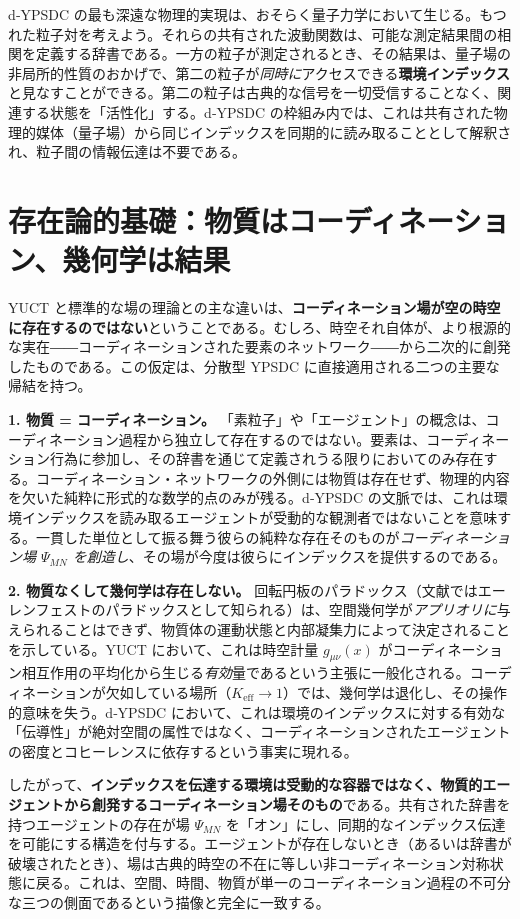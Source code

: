 \documentclass[11pt,a4paper]{article}
\begin{document}
	d‑YPSDC の最も深遠な物理的実現は、おそらく量子力学において生じる。もつれた粒子対を考えよう。それらの共有された波動関数は、可能な測定結果間の相関を定義する辞書である。一方の粒子が測定されるとき、その結果は、量子場の非局所的性質のおかげで、第二の粒子が\emph{同時に}アクセスできる\textbf{環境インデックス}と見なすことができる。第二の粒子は古典的な信号を一切受信することなく、関連する状態を「活性化」する。d‑YPSDC の枠組み内では、これは共有された物理的媒体（量子場）から同じインデックスを同期的に読み取ることとして解釈され、粒子間の情報伝達は不要である。
	
	\section{存在論的基礎：物質はコーディネーション、幾何学は結果}
	
	YUCT と標準的な場の理論との主な違いは、\textbf{コーディネーション場が空の時空に存在するのではない}ということである。むしろ、時空それ自体が、より根源的な実在――コーディネーションされた要素のネットワーク――から二次的に創発したものである。この仮定は、分散型 YPSDC に直接適用される二つの主要な帰結を持つ。
	
	\textbf{1. 物質 = コーディネーション。} 「素粒子」や「エージェント」の概念は、コーディネーション過程から独立して存在するのではない。要素は、コーディネーション行為に参加し、その辞書を通じて定義されうる限りにおいてのみ存在する。コーディネーション・ネットワークの外側には物質は存在せず、物理的内容を欠いた純粋に形式的な数学的点のみが残る。d‑YPSDC の文脈では、これは環境インデックスを読み取るエージェントが受動的な観測者ではないことを意味する。一貫した単位として振る舞う彼らの純粋な存在そのものが\emph{コーディネーション場 \(\Psi_{MN}\) を創造し}、その場が今度は彼らにインデックスを提供するのである。
	
	\textbf{2. 物質なくして幾何学は存在しない。} 回転円板のパラドックス（文献ではエーレンフェストのパラドックスとして知られる）は、空間幾何学が\emph{アプリオリに}与えられることはできず、物質体の運動状態と内部凝集力によって決定されることを示している。YUCT において、これは時空計量 \(g_{\mu\nu}(x)\) がコーディネーション相互作用の平均化から生じる\emph{有効}量であるという主張に一般化される。コーディネーションが欠如している場所（\(K_{\mathrm{eff}} \to 1\)）では、幾何学は退化し、その操作的意味を失う。d‑YPSDC において、これは環境のインデックスに対する有効な「伝導性」が絶対空間の属性ではなく、コーディネーションされたエージェントの密度とコヒーレンスに依存するという事実に現れる。
	
	したがって、\textbf{インデックスを伝達する環境は受動的な容器ではなく、物質的エージェントから創発するコーディネーション場そのもの}である。共有された辞書を持つエージェントの存在が場 \(\Psi_{MN}\) を「オン」にし、同期的なインデックス伝達を可能にする構造を付与する。エージェントが存在しないとき（あるいは辞書が破壊されたとき）、場は古典的時空の不在に等しい非コーディネーション対称状態に戻る。これは、空間、時間、物質が単一のコーディネーション過程の不可分な三つの側面であるという描像と完全に一致する。
	
\end{document}
